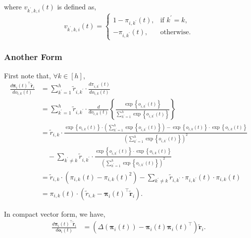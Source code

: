 \documentclass[10pt]{article}
\def\rvo{{\mathbf{o}}}
\def\rvo{{\mathbf{o}}}
\def\rvtilder{{\tilde{\mathbf{r}}}}
\def\rvpi{{\boldsymbol{\pi}}}
\begin{document}
where $v_{k^\prime,k,i}(t)$ is defined as,
\begin{equation*}
	v_{k^\prime,k,i}(t) = \begin{cases}
    1 - \pi_{i,k^\prime}(t), & \text{if $k^\prime = k$}, \\
    - \pi_{i,k^\prime}(t), & \text{otherwise}.
  \end{cases}
\end{equation*}

\subsubsection{Another Form}

First note that, $\forall k \in [h]$,
\begin{equation*}
\begin{split}
    \frac{d \rvpi_i(t)^\top \rvtilder_i}{d o_{i,k}(t)} &= \sum\limits_{k^\prime = 1}^{h}{ \tilde{r}_{i, k^\prime} \cdot \frac{d \pi_{i,k^\prime}(t) }{d o_{i,k}(t)}} \\
    &= \sum\limits_{k^\prime = 1}^{h}{ \tilde{r}_{i, k^\prime} \cdot \frac{d }{d o_{i,k}(t)}} \left\{ \frac{\exp\left\{ o_{i,k^\prime}(t) \right\}}{\sum\limits_{k^\prime = 1}^{h}{\exp\left\{ o_{i,k^\prime}(t) \right\}}} \right\} \\
    &= \tilde{r}_{i, k} \cdot \frac{ \exp\left\{ o_{i,k}(t) \right\} \cdot \left( \sum\limits_{k^\prime = 1}^{h}{\exp\left\{ o_{i,k^\prime}(t) \right\}} \right) - \exp\left\{ o_{i,k}(t) \right\} \cdot \exp\left\{ o_{i,k}(t) \right\} }{ \left( \sum\limits_{k^\prime = 1}^{h}{\exp\left\{ o_{i,k^\prime}(t) \right\}} \right)^2 } \\
    &\quad - \sum\limits_{k^\prime \not= k}{ \tilde{r}_{i, k^\prime} \cdot \frac{\exp\left\{ o_{i,k^\prime}(t) \right\} \cdot \exp\left\{ o_{i,k}(t) \right\} }{ \left( \sum\limits_{k^\prime = 1}^{h}{\exp\left\{ o_{i,k^\prime}(t) \right\}} \right)^2 }} \\
    &= \tilde{r}_{i, k} \cdot \left( \pi_{i,k}(t) - \pi_{i,k}(t)^2 \right) - \sum\limits_{k^\prime \not= k}{ \tilde{r}_{i, k^\prime} \cdot \pi_{i,k^\prime}(t) \cdot \pi_{i,k}(t) } \\
    &= \pi_{i,k}(t) \cdot \left( \tilde{r}_{i, k} - \rvpi_i(t)^\top \rvtilder_i \right).
\end{split}
\end{equation*}

\noindent In compact vector form, we have,
\begin{equation*}
\begin{split}
    \frac{d \rvpi_i(t)^\top \rvtilder_i}{d \rvo_{i}(t)} &= \left( \Delta\left( \rvpi_i(t) \right) - \rvpi_i(t) \rvpi_i(t)^\top \right) \rvtilder_i .
\end{split}
\end{equation*}
\end{document}
